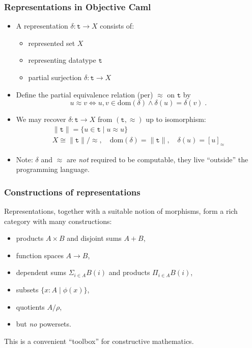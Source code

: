 \documentclass[t,handout]{beamer}
\newcommand{\per}{\approx}
\newcommand{\dom}[1]{\mathrm{dom}(#1)}
\begin{document}
\begin{frame}
  \frametitle{Representations in Objective Caml}

  \begin{itemize}
  \item A representation $\delta: \mathtt{t} \to X$ consists of:
    \begin{itemize}[<.->]
    \item represented set $X$
    \item representing datatype $\mathtt{t}$
    \item partial surjection $\delta : \mathtt{t} \to X$
    \end{itemize}
  \item 
    Define the partial equivalence relation (per) $\per$ on
    $\mathtt{t}$ by
    \begin{equation*}
      u \per v \iff u, v \in \dom{\delta} \land \delta(u) = \delta(v) \;.
    \end{equation*}
  \item 
    We may recover $\delta : \mathtt{t} \to X $ from $(\mathtt{t},
    \per)$ up to isomorphism:
    \begin{gather*}
      \|\mathtt{t}\| = \{ u \in \mathtt{t} \mid u \per u \}
      \\
      X \cong \|\mathtt{t}\|/{\per}, \quad \dom{\delta} =
      \|\mathtt{t}\|, \quad \delta(u) = [u]_{\per}
    \end{gather*}
  \item Note: $\delta$ and $\per$ are \emph{not} required to be
    computable, they live ``outside'' the programming language.
  \end{itemize}
\end{frame}

\begin{frame}
  \frametitle{Constructions of representations}

  Representations, together with a suitable notion of morphisms, form a
  rich category with many constructions:
  \begin{itemize}[<.->]
  \item products $A \times B$ and disjoint sums $A + B$,
  \item function spaces $A \to B$,
  \item dependent sums $\Sigma_{i \in A} B(i)$ and products $\Pi_{i
      \in A} B(i)$,
  \item subsets $\{x : A \mid \phi(x)\}$,
  \item quotients $A/{\rho}$,
  \item but \emph{no} powersets.
  \end{itemize}
  This is a convenient ``toolbox'' for constructive mathematics.

\end{frame}
\end{document}
